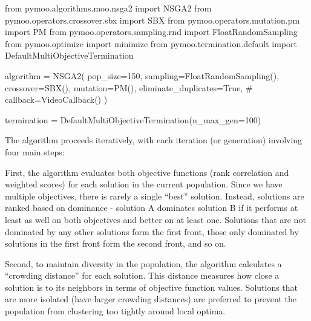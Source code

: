 \documentclass[
  authoryear,
  preprint,
  3p]{elsarticle}
\newenvironment{Shaded}{\begin{snugshade}}{\end{snugshade}}
\newcommand{\CommentTok}[1]{\textcolor[rgb]{0.37,0.37,0.37}{#1}}
\newcommand{\DecValTok}[1]{\textcolor[rgb]{0.68,0.00,0.00}{#1}}
\newcommand{\ImportTok}[1]{\textcolor[rgb]{0.00,0.46,0.62}{#1}}
\newcommand{\NormalTok}[1]{\textcolor[rgb]{0.00,0.23,0.31}{#1}}
\newcommand{\OperatorTok}[1]{\textcolor[rgb]{0.37,0.37,0.37}{#1}}
\newcommand{\VariableTok}[1]{\textcolor[rgb]{0.07,0.07,0.07}{#1}}
\begin{document}
\begin{Shaded}
\begin{Highlighting}[]
\ImportTok{from}\NormalTok{ pymoo.algorithms.moo.nsga2 }\ImportTok{import}\NormalTok{ NSGA2}
\ImportTok{from}\NormalTok{ pymoo.operators.crossover.sbx }\ImportTok{import}\NormalTok{ SBX}
\ImportTok{from}\NormalTok{ pymoo.operators.mutation.pm }\ImportTok{import}\NormalTok{ PM}
\ImportTok{from}\NormalTok{ pymoo.operators.sampling.rnd }\ImportTok{import}\NormalTok{ FloatRandomSampling}
\ImportTok{from}\NormalTok{ pymoo.optimize }\ImportTok{import}\NormalTok{ minimize}
\ImportTok{from}\NormalTok{ pymoo.termination.default }\ImportTok{import}\NormalTok{ DefaultMultiObjectiveTermination}

\NormalTok{algorithm }\OperatorTok{=}\NormalTok{ NSGA2(}
\NormalTok{    pop\_size}\OperatorTok{=}\DecValTok{150}\NormalTok{,}
\NormalTok{    sampling}\OperatorTok{=}\NormalTok{FloatRandomSampling(),}
\NormalTok{    crossover}\OperatorTok{=}\NormalTok{SBX(),}
\NormalTok{    mutation}\OperatorTok{=}\NormalTok{PM(),}
\NormalTok{    eliminate\_duplicates}\OperatorTok{=}\VariableTok{True}\NormalTok{,}
    \CommentTok{\# callback=VideoCallback()}
\NormalTok{)}

\NormalTok{termination }\OperatorTok{=}\NormalTok{ DefaultMultiObjectiveTermination(n\_max\_gen}\OperatorTok{=}\DecValTok{100}\NormalTok{)}
\end{Highlighting}
\end{Shaded}

The algorithm proceeds iteratively, with each iteration (or generation)
involving four main steps:

First, the algorithm evaluates both objective functions (rank
correlation and weighted scores) for each solution in the current
population. Since we have multiple objectives, there is rarely a single
``best'' solution. Instead, solutions are ranked based on dominance -
solution A dominates solution B if it performs at least as well on both
objectives and better on at least one. Solutions that are not dominated
by any other solutions form the first front, those only dominated by
solutions in the first front form the second front, and so on.

Second, to maintain diversity in the population, the algorithm
calculates a ``crowding distance'' for each solution. This distance
measures how close a solution is to its neighbors in terms of objective
function values. Solutions that are more isolated (have larger crowding
distances) are preferred to prevent the population from clustering too
tightly around local optima.
\end{document}
